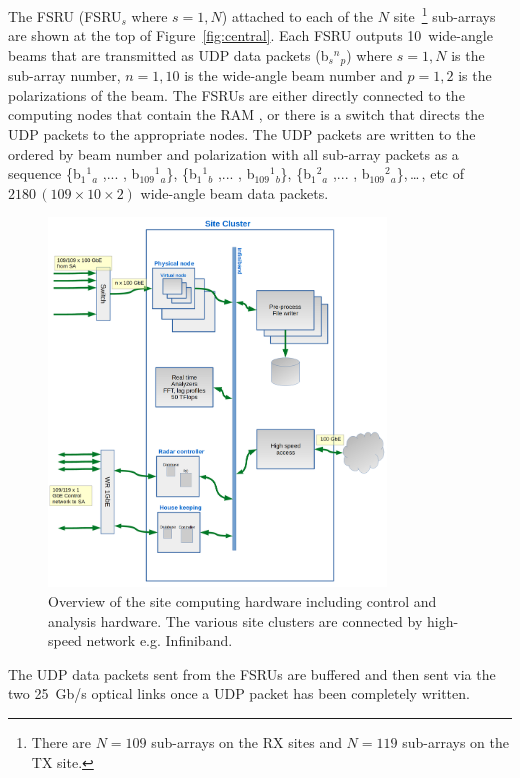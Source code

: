 \documentclass[12pt,a4paper]{article}
\begin{document}
The FSRU
(FSRU$_s$ where $s=1,N$) attached to each of the $N$ site~\footnote{There are $N=109$ sub-arrays on the RX sites and $N=119$ sub-arrays on the TX site.} sub-arrays are shown at the top of Figure~\ref{fig:central}. 
Each FSRU outputs 10~wide-angle beams that are transmitted as UDP data packets 
(b${_s} {^n} {_p}$) where $s=1,N$ is the sub-array number, $n=1,10$ is the wide-angle beam number and $p=1,2$ is the polarizations of the beam.
The FSRUs are either directly connected to the computing nodes that contain the RAM \RB{}, or there is a switch that directs the UDP packets to the appropriate nodes.
The UDP packets are written to the \RB ordered by beam number and polarization with all sub-array packets as a sequence
\{b${_1} {^1} {_a}$ ,... , b${_{109}} {^1} {_a}$\},
\{b${_1} {^1} {_b}$ ,... , b${_{109}} {^1} {_b}$\},
\{b${_1} {^2} {_a}$ ,... , b${_{109}} {^2} {_a}$\},\,\ldots{}\,, etc of $2180\,(109 \times 10 \times 2)$  wide-angle beam data packets.
\begin{figure}
\centering
\includegraphics[width=0.8\textwidth]{E3D_dataflow_3aa.png}
\caption{Overview of the site computing hardware including control and analysis hardware. The various site clusters are connected by high-speed network e.g. Infiniband. \label{fig:sitecluster}}
\end{figure}
The UDP data packets sent from the FSRUs are buffered and then sent via the two 25~Gb/s optical links once a UDP packet has been completely written.
\end{document}

